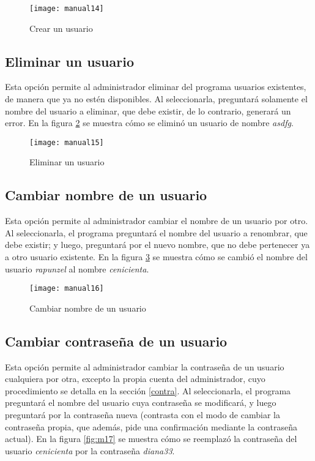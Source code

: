 \documentclass[titlepage,letterpaper,12pt]{article}
\begin{document}
\begin{figure}
  \centering
  \texttt{[image: manual14]}
  \vspace{-1cm}
  \caption{Crear un usuario}
  \label{fig:m14}
\end{figure}

\subsection{Eliminar un usuario}
Esta opción permite al administrador eliminar del programa usuarios existentes, de manera que ya no estén disponibles. Al seleccionarla, preguntará solamente el nombre del usuario a eliminar, que debe existir, de lo contrario, generará un error. En la figura \ref{fig:m15} se muestra cómo se eliminó un usuario de nombre \emph{asdfg}.

\begin{figure}
  \centering
  \texttt{[image: manual15]}
  \vspace{-1cm}
  \caption{Eliminar un usuario}
  \label{fig:m15}
\end{figure}

\subsection{Cambiar nombre de un usuario}
Esta opción permite al administrador cambiar el nombre de un usuario por otro. Al seleccionarla, el programa preguntará el nombre del usuario a renombrar, que debe existir; y luego, preguntará por el nuevo nombre, que no debe pertenecer ya a otro usuario existente. En la figura \ref{fig:m16} se muestra cómo se cambió el nombre del usuario \emph{rapunzel} al nombre \emph{cenicienta}.

\begin{figure}
  \centering
  \texttt{[image: manual16]}
  \vspace{-1cm}
  \caption{Cambiar nombre de un usuario}
  \label{fig:m16}
\end{figure}

\subsection{Cambiar contraseña de un usuario}
Esta opción permite al administrador cambiar la contraseña de un usuario cualquiera por otra, excepto la propia cuenta del administrador, cuyo procedimiento se detalla en la sección \ref{contra}. Al seleccionarla, el programa preguntará el nombre del usuario cuya contraseña se modificará, y luego preguntará por la contraseña nueva (contrasta con el modo de cambiar la contraseña propia, que además, pide una confirmación mediante la contraseña actual). En la figura \ref{fig:m17} se muestra cómo se reemplazó la contraseña del usuario \emph{cenicienta} por la contraseña \emph{diana33}.
\end{document}
